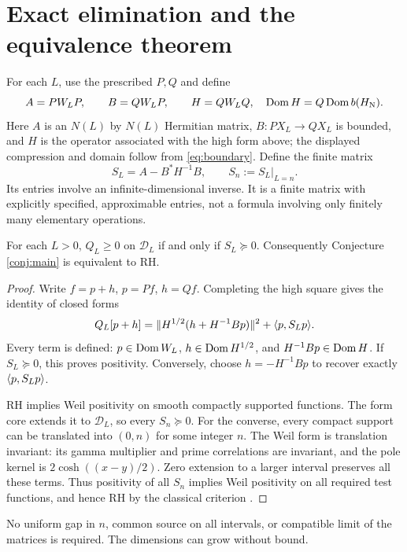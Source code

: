 \section{Exact elimination and the equivalence theorem}
For each $L$, use the prescribed $P,Q$ and define
\[
A=PW_LP,\qquad B=QW_LP,\qquad
H=QW_LQ,\quad \operatorname{Dom} H=Q\operatorname{Dom} b(H_{\rm N}).
\]
Here $A$ is an $N(L)$ by $N(L)$ Hermitian matrix, $B:PX_L\to QX_L$ is
bounded, and $H$ is the operator associated with the high form above;
the displayed compression and domain follow from \eqref{eq:boundary}. Define the finite matrix
\begin{equation}\label{eq:schur}
S_L=A-B^*H^{-1}B,\qquad S_n:=S_L\big|_{L=n}.
\end{equation}
Its entries involve an infinite-dimensional inverse. It is a finite matrix
with explicitly specified, approximable entries, not a formula involving
only finitely many elementary operations.

\begin{theorem}\label{thm:equiv}
For each $L>0$, $Q_L\ge0$ on $\mathcal D_L$ if and only if $S_L\succeq0$.
Consequently Conjecture \ref{conj:main} is equivalent to RH.
\end{theorem}
\begin{proof}
Write $f=p+h$, $p=Pf$, $h=Qf$. Completing the high square gives the
identity of closed forms
\begin{equation}\label{eq:square}
Q_L[p+h]=\lVert H^{1/2}(h+H^{-1}Bp)\rVert^2+\langle p,S_Lp\rangle.
\end{equation}
Every term is defined: $p\in\operatorname{Dom} W_L$, $h\in\operatorname{Dom} H^{1/2}$, and
$H^{-1}Bp\in\operatorname{Dom} H$. If $S_L\succeq0$, this proves positivity. Conversely,
choose $h=-H^{-1}Bp$ to recover exactly $\langle p,S_Lp\rangle$.

RH implies Weil positivity on smooth compactly supported functions.
The form core extends it to $\mathcal D_L$, so every $S_n\succeq0$.
For the converse, every compact support can be translated into $(0,n)$
for some integer $n$. The Weil form is translation invariant: its gamma
multiplier and prime correlations are invariant, and the pole kernel is
$2\cosh((x-y)/2)$. Zero extension to a larger interval preserves all these
terms. Thus positivity of all $S_n$ implies Weil positivity on all required
test functions, and hence RH by the classical criterion \cite{Suzuki}.
\end{proof}
No uniform gap in $n$, common source on all intervals, or compatible limit
of the matrices is required. The dimensions can grow without bound.

